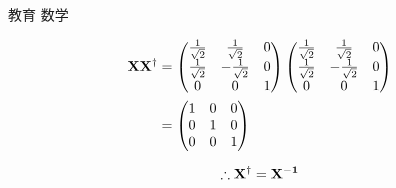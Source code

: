 \documentclass[fleqn]{jbook}
\begin{document}
\begin{answer}{教育 数学}{}
\begin{subanswers}
\begin{subsubanswers}
\SubSubAnswer
      \begin{align*}
      {\rm\bf X}{\rm\bf X}^{\dagger} 
         &=
            \begin{pmatrix}
              \frac{1}{\sqrt{2}} & \frac{1}{\sqrt{2}} & 0 \\
              \frac{1}{\sqrt{2}} & -\frac{1}{\sqrt{2}} & 0 \\
              0 & 0 & 1 
              \end{pmatrix}
            \begin{pmatrix}
              \frac{1}{\sqrt{2}} & \frac{1}{\sqrt{2}} & 0 \\
              \frac{1}{\sqrt{2}} & -\frac{1}{\sqrt{2}} & 0 \\
              0 & 0 & 1 
            \end{pmatrix}\\
         &=
            \begin{pmatrix}
              1 & 0 & 0 \\
              0 & 1 & 0 \\
              0 & 0 & 1 
            \end{pmatrix}
          \end{align*}

      \[
      \therefore {\rm\bf X}^{\dagger} = {\rm\bf {\rm\bf X^{-1}}}
      \]
      

\end{subsubanswers}
\end{subanswers}
\end{answer}
\end{document}
